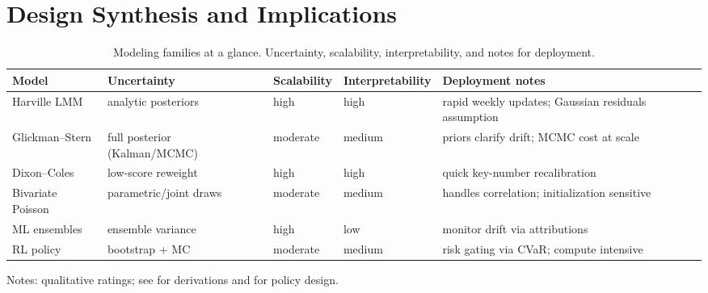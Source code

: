 \section{Design Synthesis and Implications}
\label{sec:synth}

\begin{table}[p]
  \vspace*{\fill}
  \centering
  \begin{adjustwidth}{-0.35in}{-0.35in}
  \begin{threeparttable}
  \captionsetup{justification=centering}
  \caption[Modeling families at a glance]{Modeling families at a glance. Uncertainty, scalability, interpretability, and notes for deployment.}
  \label{tab:model-compare}
  \begingroup
   \footnotesize
   \setlength{\tabcolsep}{4pt}%
   \renewcommand{\arraystretch}{1.18}%
   \setlength{\aboverulesep}{0.6ex}%
   \setlength{\belowrulesep}{0.5ex}%
   \begin{tabularx}{\linewidth}{@{} l Y Y Y Y @{} }
     \toprule[1.2pt]
     \textbf{Model} & \textbf{Uncertainty} & \textbf{Scalability} & \textbf{Interpretability} & \textbf{Deployment notes} \\
     \midrule
     Harville LMM & analytic posteriors & high & high & rapid weekly updates; Gaussian residuals assumption \\
     Glickman--Stern & full posterior (Kalman/MCMC) & moderate & medium & priors clarify drift; MCMC cost at scale \\
     Dixon--Coles & low-score reweight & high & high & quick key-number recalibration \\
     Bivariate Poisson & parametric/joint draws & moderate & medium & handles correlation; initialization sensitive \\
     ML ensembles & ensemble variance & high & low & monitor drift via attributions \\
     RL policy & bootstrap + MC & moderate & medium & risk gating via CVaR; compute intensive \\
     \bottomrule[1.2pt]
   \end{tabularx}
  \endgroup
  \begin{tablenotes}[flushleft]\footnotesize
    \item Notes: qualitative ratings; see  for derivations and  for policy design.
  \end{tablenotes}
  \end{threeparttable}
  \end{adjustwidth}
  \vspace*{\fill}
\end{table}

